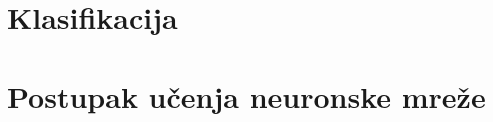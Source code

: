 \section{Klasifikacija}
\label{sec:klasifikacija}


\section{Postupak učenja neuronske mreže}
\label{sec:postupak-ucenja-neuronske-mreze}
